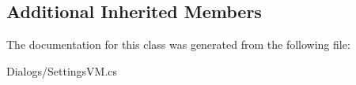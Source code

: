 \subsection*{Additional Inherited Members}


The documentation for this class was generated from the following file\+:\begin{DoxyCompactItemize}
\item 
Dialogs/Settings\+V\+M.\+cs\end{DoxyCompactItemize}
